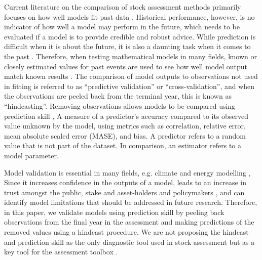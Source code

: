 \documentclass[11pt,a4paper]{article}
\begin{document}
{Current literature on the comparison of stock assessment methods primarily focuses on how well models fit past data  \citep[e.g.][]{deroba2014simulation}. Historical performance, however, is no indicator of how well a model may perform in the future, which needs to be evaluated if a model is to provide credible and robust advice. 
While prediction is difficult when it is about the future, it is also a daunting task when it comes to the past \citep{glotin2019prediction}. Therefore, when testing mathematical models in many fields, known or closely estimated values for past events are used to see how well model output match known results \citep{jin2008current, weigel2008can, balmaseda1995decadal}. The comparison of model outputs to observations not used in fitting is referred to as “predictive validation” or “cross-validation”, and when the observations are peeled back from the terminal year, this is known as “hindcasting”. Removing observations allows models to be compared using prediction skill \citep{glickman2000glossary}, A measure of a predictor's accuracy compared to its observed value unknown by the model, using metrics such as correlation, relative error, mean absolute scaled error (MASE), and bias.  A predictor refers to a random value that is not part of the dataset. In comparison, an estimator refers to a model parameter.

Model validation is essential in many fields, e.g. climate and energy modelling \citep{kell2020long}, Since it increases confidence in the outputs of a model, leads to an increase in trust amongst the public, stake and asset-holders and policymakers \citep[][]{saltelli2020five}, and can identify model limitations that should be addressed in future research.
Therefore, in this paper, we validate models using prediction skill by peeling back observations from the final year in the assessment and making predictions of the removed values using a hindcast procedure. We are not proposing the hindcast and prediction skill as the only diagnostic tool used in stock assessment but as a key tool for the assessment toolbox \citep{carvalho2020cookbook}.


}
\end{document}
